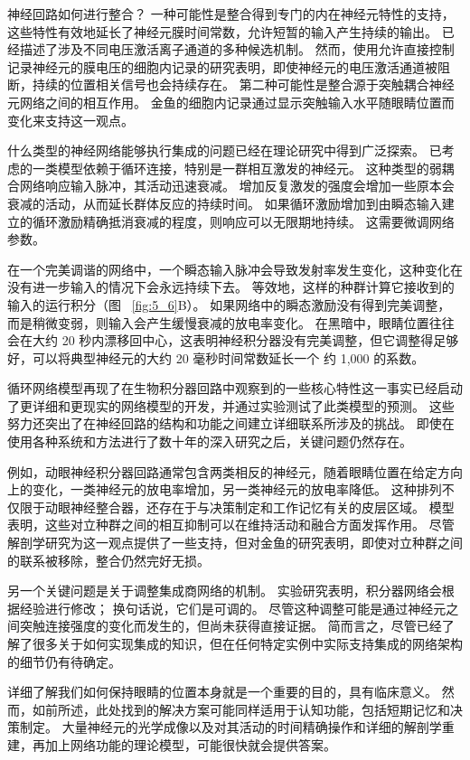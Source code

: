 神经回路如何进行整合？ 
一种可能性是整合得到专门的内在神经元特性的支持，这些特性有效地延长了神经元膜时间常数，允许短暂的输入产生持续的输出。
已经描述了涉及不同电压激活离子通道的多种候选机制。 
然而，使用允许直接控制记录神经元的膜电压的细胞内记录的研究表明，即使神经元的电压激活通道被阻断，持续的位置相关信号也会持续存在。 
第二种可能性是整合源于突触耦合神经元网络之间的相互作用。 
金鱼的细胞内记录通过显示突触输入水平随眼睛位置而变化来支持这一观点。


什么类型的神经网络能够执行集成的问题已经在理论研究中得到广泛探索。 
已考虑的一类模型依赖于循环连接，特别是一群相互激发的神经元。 
这种类型的弱耦合网络响应输入脉冲，其活动迅速衰减。 
增加反复激发的强度会增加一些原本会衰减的活动，从而延长群体反应的持续时间。
如果循环激励增加到由瞬态输入建立的循环激励精确抵消衰减的程度，则响应可以无限期地持续。 这需要微调网络参数。


在一个完美调谐的网络中，一个瞬态输入脉冲会导致发射率发生变化，这种变化在没有进一步输入的情况下会永远持续下去。 
等效地，这样的种群计算它接收到的输入的运行积分（图 ~\ref{fig:5_6}B）。 
如果网络中的瞬态激励没有得到完美调整，而是稍微变弱，则输入会产生缓慢衰减的放电率变化。 
在黑暗中，眼睛位置往往会在大约 20 秒内漂移回中心，这表明神经积分器没有完美调整，但它调整得足够好，可以将典型神经元的大约 20 毫秒时间常数延长一个 约 1,000 的系数。


循环网络模型再现了在生物积分器回路中观察到的一些核心特性这一事实已经启动了更详细和更现实的网络模型的开发，并通过实验测试了此类模型的预测。 
这些努力还突出了在神经回路的结构和功能之间建立详细联系所涉及的挑战。 
即使在使用各种系统和方法进行了数十年的深入研究之后，关键问题仍然存在。


例如，动眼神经积分器回路通常包含两类相反的神经元，随着眼睛位置在给定方向上的变化，一类神经元的放电率增加，另一类神经元的放电率降低。 
这种排列不仅限于动眼神经整合器，还存在于与决策制定和工作记忆有关的皮层区域。
模型表明，这些对立种群之间的相互抑制可以在维持活动和融合方面发挥作用。 
尽管解剖学研究为这一观点提供了一些支持，但对金鱼的研究表明，即使对立种群之间的联系被移除，整合仍然完好无损。


另一个关键问题是关于调整集成商网络的机制。 
实验研究表明，积分器网络会根据经验进行修改；
换句话说，它们是可调的。 
尽管这种调整可能是通过神经元之间突触连接强度的变化而发生的，但尚未获得直接证据。 
简而言之，尽管已经了解了很多关于如何实现集成的知识，但在任何特定实例中实际支持集成的网络架构的细节仍有待确定。


详细了解我们如何保持眼睛的位置本身就是一个重要的目的，具有临床意义。 
然而，如前所述，此处找到的解决方案可能同样适用于认知功能，包括短期记忆和决策制定。
大量神经元的光学成像以及对其活动的时间精确操作和详细的解剖学重建，再加上网络功能的理论模型，可能很快就会提供答案。



